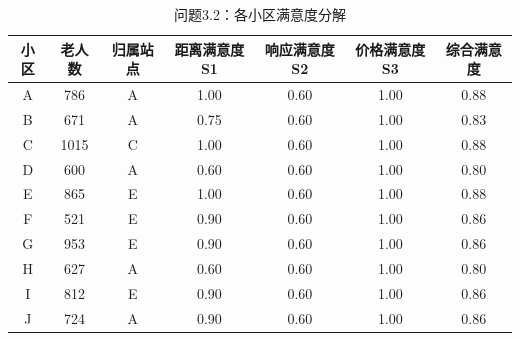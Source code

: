 \begin{table}[h]
\centering
\caption{问题3.2：各小区满意度分解}
\small
\begin{tabular}{|c|c|c|c|c|c|c|}
\hline
小区 & 老人数 & 归属站点 & 距离满意度S1 & 响应满意度S2 & 价格满意度S3 & 综合满意度 \\
\hline
A & 786 & A & 1.00 & 0.60 & 1.00 & 0.88 \\
B & 671 & A & 0.75 & 0.60 & 1.00 & 0.83 \\
C & 1015 & C & 1.00 & 0.60 & 1.00 & 0.88 \\
D & 600 & A & 0.60 & 0.60 & 1.00 & 0.80 \\
E & 865 & E & 1.00 & 0.60 & 1.00 & 0.88 \\
F & 521 & E & 0.90 & 0.60 & 1.00 & 0.86 \\
G & 953 & E & 0.90 & 0.60 & 1.00 & 0.86 \\
H & 627 & A & 0.60 & 0.60 & 1.00 & 0.80 \\
I & 812 & E & 0.90 & 0.60 & 1.00 & 0.86 \\
J & 724 & A & 0.90 & 0.60 & 1.00 & 0.86 \\
\hline
\end{tabular}
\end{table}